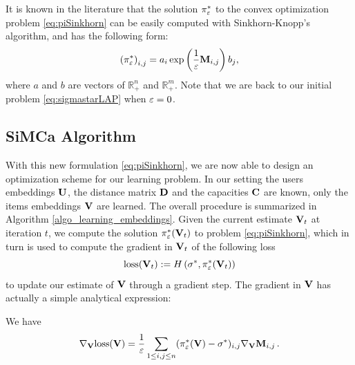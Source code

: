 It is known in the literature \cite{cuturi_sinkhorn_2013} that the solution $\pi_{\varepsilon}^*$ to the convex optimization problem \eqref{eq:piSinkhorn} can be easily computed with Sinkhorn-Knopp's algorithm, and has the following form:
\begin{equation}\label{eq:formesinkhorn}
    \left(\pi_{\varepsilon}^* \right)_{i,j} = a_i \exp\left( \frac{1}{\varepsilon} \mathbf{M}_{i,j} \right) b_j,
\end{equation} where $a$ and $b$ are vectors of $\mathbb{R}_+^n$ and $\mathbb{R}_+^m$.
Note that we are back to our initial problem \eqref{eq:sigmastarLAP} when $\varepsilon=0$.

\subsection*{SiMCa Algorithm}
With this new formulation \eqref{eq:piSinkhorn}, we are now able to design an optimization scheme for our learning problem. In our setting the users embeddings $\mathbf{U}$, the distance matrix $\mathbf{D}$ and the capacities $\mathbf{C}$ are known, only the items embeddings $\mathbf{V}$ are learned. The overall procedure is summarized in Algorithm \ref{algo_learning_embeddings}. Given the current estimate $\mathbf{V}_t$ at iteration $t$, we compute the solution $\pi^*_{\varepsilon}(\mathbf{V}_t)$ to problem \eqref{eq:piSinkhorn}, which in turn is used to compute the gradient in $\mathbf{V}_t$ of the following loss
\begin{equation}\label{eq:loss_global}
    \mathrm{loss}(\mathbf{V}_t) := H\left(\sigma^*,\pi^*_{\varepsilon}(\mathbf{V}_t)\right)
\end{equation} to update our estimate of $\mathbf{V}$ through a gradient step. The gradient in $\mathbf{V}$
has actually a simple analytical expression:

\begin{lemma}\label{lemma:gradient}
We have
    \begin{equation}
    \label{eq:gradient}
    \nabla_{\mathbf{V}} \mathrm{loss}(\mathbf{V}) = \frac{1}{\varepsilon} \sum_{1 \leq i,j \leq n} (\pi^*_\varepsilon(\mathbf{V}) - \sigma^*)_{i,j} \nabla_{\mathbf{V}} \mathbf{M}_{i,j} \, .
\end{equation}
\end{lemma}

